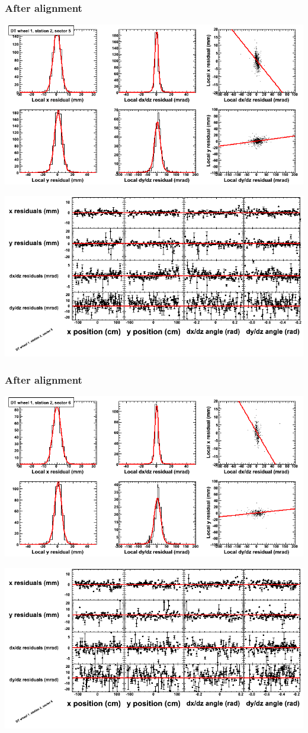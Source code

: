 \documentclass[compress]{beamer}
\begin{document}
\begin{frame}
\frametitle{After alignment}
\includegraphics[width=0.7\linewidth]{NOV4_fitfunctions/MBwhDst2sec05_bellcurves.png}

\includegraphics[width=0.7\linewidth]{NOV4_fitfunctions/MBwhDst2sec05_polynomials.png}
\end{frame}

\begin{frame}
\frametitle{After alignment}
\includegraphics[width=0.7\linewidth]{NOV4_fitfunctions/MBwhDst2sec06_bellcurves.png}

\includegraphics[width=0.7\linewidth]{NOV4_fitfunctions/MBwhDst2sec06_polynomials.png}
\end{frame}
\end{document}
